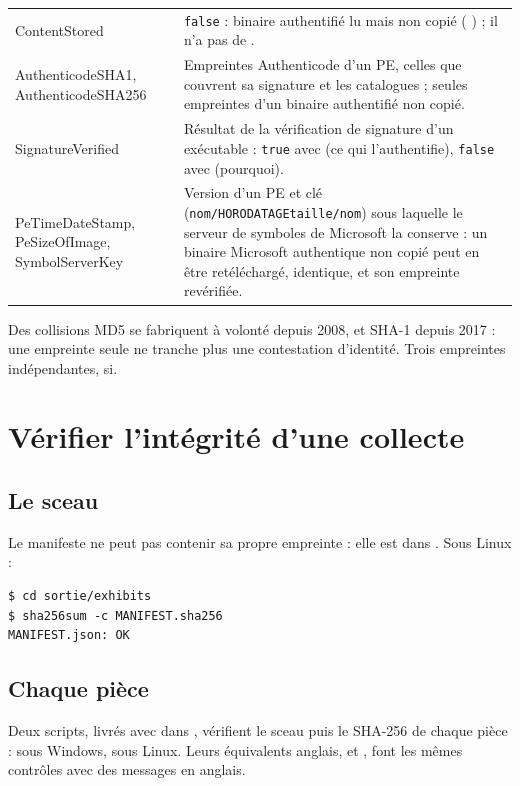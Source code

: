 \documentclass[11pt,a4paper,oneside]{report}
\begin{document}
\begin{longtable}{@{}>{\ttfamily}L{4.2cm}L{10.2cm}@{}}
ContentStored & \texttt{false} : binaire authentifié lu mais non copié
  ( ) ; il n'a pas de . \\
AuthenticodeSHA1, AuthenticodeSHA256 & Empreintes Authenticode d'un PE, celles
  que couvrent sa signature et les catalogues ; seules empreintes d'un binaire
  authentifié non copié. \\
SignatureVerified & Résultat de la vérification de signature d'un exécutable :
  \texttt{true} avec  (ce qui l'authentifie), \texttt{false}
  avec  (pourquoi). \\
PeTimeDateStamp, PeSizeOfImage, SymbolServerKey & Version d'un PE et clé
  (\texttt{nom/HORODATAGEtaille/nom}) sous laquelle le serveur de symboles de
  Microsoft la conserve : un binaire Microsoft authentique non copié peut en
  être retéléchargé, identique, et son empreinte revérifiée. \\
\bottomrule
\end{longtable}

\begin{note}
Des collisions MD5 se fabriquent à volonté depuis 2008, et SHA-1 depuis 2017 : une
empreinte seule ne tranche plus une contestation d'identité. Trois empreintes
indépendantes, si.
\end{note}

\section{Vérifier l'intégrité d'une collecte}\label{sec:verif}

\subsection{Le sceau}

Le manifeste ne peut pas contenir sa propre empreinte : elle est dans
. Sous Linux :

\begin{lstlisting}
$ cd sortie/exhibits
$ sha256sum -c MANIFEST.sha256
MANIFEST.json: OK
\end{lstlisting}

\subsection{Chaque pièce}

Deux scripts, livrés avec  dans ,
vérifient le sceau puis le SHA-256 de chaque pièce :
 sous Windows, 
sous Linux. Leurs équivalents anglais,  et
, font les mêmes contrôles avec des messages en
anglais.
\end{document}
